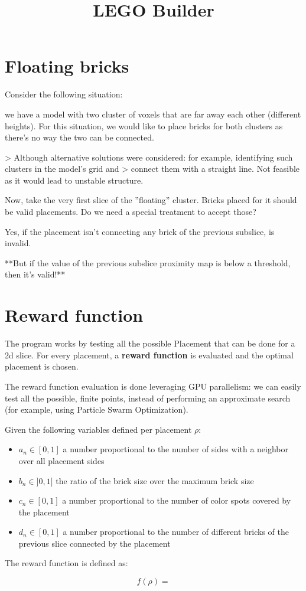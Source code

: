 
\title{LEGO Builder}

\section{Floating bricks}

Consider the following situation:

we have a model with two cluster of voxels that are far away each other (different heights).
For this situation, we would like to place bricks for both clusters as there's no way the two can be connected.

> Although alternative solutions were considered: for example, identifying such clusters in the model's grid and
> connect them with a straight line. Not feasible as it would lead to unstable structure.

Now, take the very first slice of the ''floating'' cluster.
Bricks placed for it should be valid placements.
Do we need a special treatment to accept those? 

Yes, if the placement isn't connecting any brick of the previous subslice, is invalid.

**But if the value of the previous subslice proximity map is below a threshold, then it's valid!**

\section{Reward function}

The program works by testing all the possible Placement that can be done for a 2d slice.
For every placement, a \textbf{reward function} is evaluated and the optimal placement is chosen.

The reward function evaluation is done leveraging GPU parallelism:
we can easily test all the possible, finite points, instead of performing an approximate search (for example, using Particle Swarm Optimization).

Given the following variables defined per placement $\rho$:

\begin{itemize}
    \item $a_{n} \in [0, 1]$ a number proportional to the number of sides with a neighbor over all placement sides
    \item $b_{n} \in ]0, 1]$ the ratio of the brick size over the maximum brick size
    \item $c_{n} \in [0, 1]$ a number proportional to the number of color spots covered by the placement
    \item $d_{n} \in [0, 1]$ a number proportional to the number of different bricks of the previous slice connected by the placement
\end{itemize}

The reward function is defined as:

\begin{equation}
    f(\rho) =
\end{equation}
